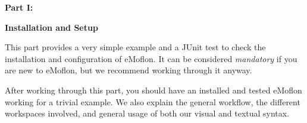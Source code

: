 {\bf \huge Part I:}
\vspace{0.7cm}
 
{\bf \Huge Installation and Setup }

\vspace{0.5cm}

This part provides a very simple example and a JUnit test to check the installation and configuration of eMoflon. It can be considered \emph{mandatory} if you
are new to eMoflon, but we recommend working through it anyway.

After working through this part, you should have an installed and tested eMoflon working for a trivial example. We also explain the general workflow, the
different workspaces involved, and general usage of both our visual and textual syntax.







